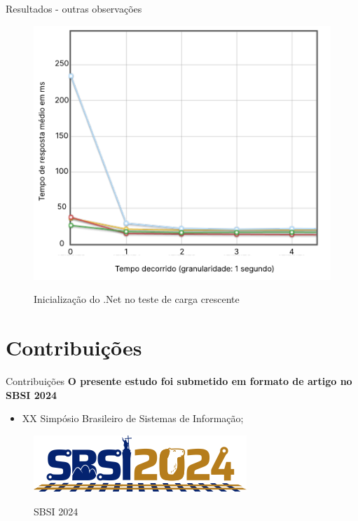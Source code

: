 \documentclass{libs/ufc_format}
\begin{document}
\begin{frame}{Resultados - outras observações}
    \begin{figure}[H]
        \centering
        \caption{Inicialização do .Net no teste de carga crescente}
        \includegraphics[width=0.65\linewidth]{figuras/resultados/start-dotnet-crescente-ex2.pdf}
        \captionsetup{justification=centering}
        \label{fig:endurance-tempo-metodos-totais}
    \end{figure}
\end{frame}

\section{Contribuições}
\begin{frame}{Contribuições}
    \textbf{O presente estudo foi submetido em formato de artigo no SBSI 2024}
    \begin{itemize}
        \item XX Simpósio Brasileiro de Sistemas de Informação;
    \end{itemize}
    \begin{figure}[H]
        \centering
        \caption{SBSI 2024}
        \includegraphics[width=0.6\linewidth]{figuras/sbsi2024.png}
        \captionsetup{justification=centering}
        \label{fig:model-endurance}
    \end{figure}
\end{frame}
 
\end{document}
